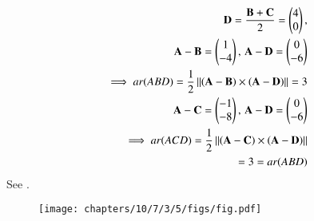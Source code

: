 \begin{align}
\mathbf{D}=\frac{\mathbf{B}+\mathbf{C}}{2}
=\begin{pmatrix}4\\ 0\end{pmatrix},
\\
	\mathbf{A}- \mathbf{B} =\begin{pmatrix}1\\ -4\end{pmatrix},\,
	  \mathbf{A}- \mathbf{D} =\begin{pmatrix}0\\ -6\end{pmatrix}
	  \\
	  \implies
  ar(ABD)=\frac{1}{2} \left\lVert\left(\mathbf{A}-\mathbf{B}\right)  \times 
   \left(\mathbf{A}- \mathbf{D}\right)\right\rVert 
	       =3	
	       \\
	\mathbf{A}- \mathbf{C} =\begin{pmatrix}-1\\ -8\end{pmatrix},\,
	  \mathbf{A}- \mathbf{D} =\begin{pmatrix}0\\ -6\end{pmatrix}
	  \\
	  \implies
  ar(ACD)=\frac{1}{2} \left\lVert\left(\mathbf{A}-\mathbf{C}\right)  \times 
   \left(\mathbf{A}- \mathbf{D}\right)\right\rVert 
   \\
	= 3 =
ar(ABD)
\end{align}
See  
.
\begin{figure}[H]
\centering
\texttt{[image: chapters/10/7/3/5/figs/fig.pdf]}
\caption{}
\label{fig:10/7/3/5/}
\end{figure} 
